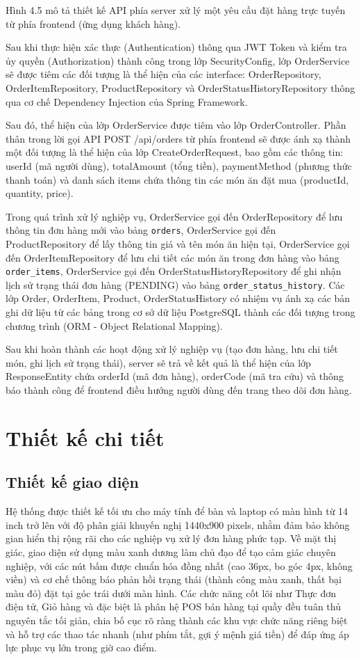 \documentclass[../20232006p.tex]{subfiles}
\begin{document}
Hình 4.5 mô tả thiết kế API phía server xử lý một yêu cầu đặt hàng trực tuyến từ phía frontend (ứng dụng khách hàng).

Sau khi thực hiện xác thực (Authentication) thông qua JWT Token và kiểm tra ủy quyền (Authorization) thành công trong lớp SecurityConfig, lớp OrderService sẽ được tiêm các đối tượng là thể hiện của các interface: OrderRepository, OrderItemRepository, ProductRepository và OrderStatusHistoryRepository thông qua cơ chế Dependency Injection của Spring Framework.

Sau đó, thể hiện của lớp OrderService được tiêm vào lớp OrderController. Phần thân trong lời gọi API POST /api/orders từ phía frontend sẽ được ánh xạ thành một đối tượng là thể hiện của lớp CreateOrderRequest, bao gồm các thông tin: userId (mã người dùng), totalAmount (tổng tiền), paymentMethod (phương thức thanh toán) và danh sách items chứa thông tin các món ăn đặt mua (productId, quantity, price).

Trong quá trình xử lý nghiệp vụ, OrderService gọi đến OrderRepository để lưu thông tin đơn hàng mới vào bảng \texttt{orders}, OrderService gọi đến ProductRepository để lấy thông tin giá và tên món ăn hiện tại, OrderService gọi đến OrderItemRepository để lưu chi tiết các món ăn trong đơn hàng vào bảng \texttt{order\_items}, OrderService gọi đến OrderStatusHistoryRepository để ghi nhận lịch sử trạng thái đơn hàng (PENDING) vào bảng \texttt{order\_status\_history}. Các lớp Order, OrderItem, Product, OrderStatusHistory có nhiệm vụ ánh xạ các bản ghi dữ liệu từ các bảng trong cơ sở dữ liệu PostgreSQL thành các đối tượng trong chương trình (ORM - Object Relational Mapping).

Sau khi hoàn thành các hoạt động xử lý nghiệp vụ (tạo đơn hàng, lưu chi tiết món, ghi lịch sử trạng thái), server sẽ trả về kết quả là thể hiện của lớp ResponseEntity chứa orderId (mã đơn hàng), orderCode (mã tra cứu) và thông báo thành công để frontend điều hướng người dùng đến trang theo dõi đơn hàng.

\section{Thiết kế chi tiết}
\subsection{Thiết kế giao diện}
Hệ thống được thiết kế tối ưu cho máy tính để bàn và laptop có màn hình từ 14 inch trở lên với độ phân giải khuyến nghị 1440x900 pixels, nhằm đảm bảo không gian hiển thị rộng rãi cho các nghiệp vụ xử lý đơn hàng phức tạp. Về mặt thị giác, giao diện sử dụng màu xanh dương làm chủ đạo để tạo cảm giác chuyên nghiệp, với các nút bấm được chuẩn hóa đồng nhất (cao 36px, bo góc 4px, không viền) và cơ chế thông báo phản hồi trạng thái (thành công màu xanh, thất bại màu đỏ) đặt tại góc trái dưới màn hình. Các chức năng cốt lõi như Thực đơn điện tử, Giỏ hàng và đặc biệt là phân hệ POS bán hàng tại quầy đều tuân thủ nguyên tắc tối giản, chia bố cục rõ ràng thành các khu vực chức năng riêng biệt và hỗ trợ các thao tác nhanh (như phím tắt, gợi ý mệnh giá tiền) để đáp ứng áp lực phục vụ lớn trong giờ cao điểm.
\end{document}

